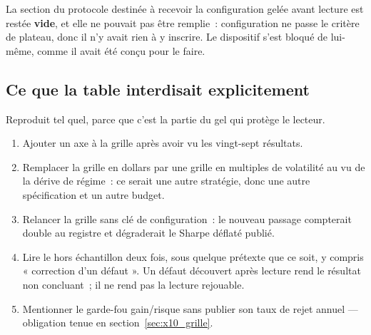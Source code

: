 La section du protocole destinée à recevoir la configuration gelée avant
lecture est restée \textbf{vide}, et elle ne pouvait pas être remplie~:
\XTenPlateauPassing{} configuration ne passe le critère de plateau, donc il
n'y avait rien à y inscrire. Le dispositif s'est bloqué de lui-même, comme il
avait été conçu pour le faire.

\subsection{Ce que la table interdisait explicitement}

Reproduit tel quel, parce que c'est la partie du gel qui protège le lecteur.

\begin{enumerate}
  \item Ajouter un axe à la grille après avoir vu les vingt-sept résultats.
  \item Remplacer la grille en dollars par une grille en multiples de
  volatilité au vu de la dérive de régime~: ce serait une autre stratégie,
  donc une autre spécification et un autre budget.
  \item Relancer la grille sans clé de configuration~: le nouveau passage
  compterait double au registre et dégraderait le Sharpe déflaté publié.
  \item Lire le hors échantillon deux fois, sous quelque prétexte que ce
  soit, y compris « correction d'un défaut ». Un défaut découvert après
  lecture rend le résultat non concluant~; il ne rend pas la lecture
  rejouable.
  \item Mentionner le garde-fou gain/risque sans publier son taux de rejet
  annuel --- obligation tenue en section~\ref{sec:x10_grille}.
\end{enumerate}
